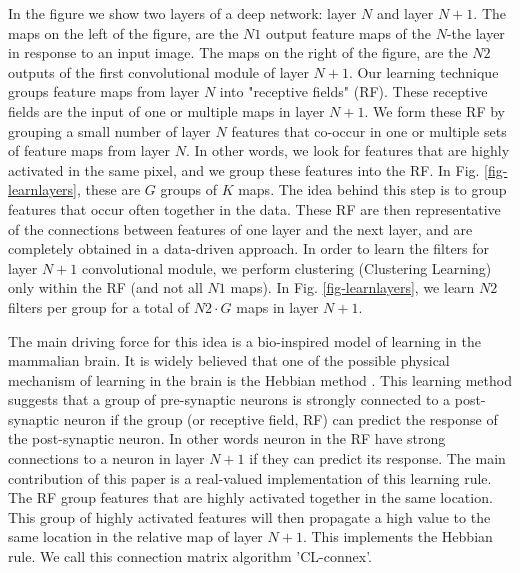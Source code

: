 \documentclass{article} %
\begin{document}
In the figure we show two layers of a deep network: layer $N$ and layer $N+1$. The maps on the left of the figure, are the $N1$ output feature maps of the $N$-the layer in response to an input image. The maps on the right of the figure, are the $N2$ outputs of the first convolutional module of layer $N+1$. 
Our learning technique groups feature maps from layer $N$ into "receptive fields" (RF). These receptive fields are the input of one or multiple maps in layer $N+1$. We form these RF by grouping a small number of layer $N$ features that co-occur in one or multiple sets of feature maps from layer $N$. In other words, we look for features that are highly activated in the same pixel, and we group these features into the RF. In Fig. \ref{fig-learnlayers}, these are $G$ groups of $K$ maps. The idea behind this step is to group features that occur often together in the data. These RF are then representative of the connections between features of one layer and the next layer, and are completely obtained in a data-driven approach.
In order to learn the filters for layer $N+1$ convolutional module, we perform clustering (Clustering Learning) only within the RF (and not all $N1$ maps). In Fig. \ref{fig-learnlayers}, we learn $N2$ filters per group for a total of $N2 \cdot G$ maps in layer $N+1$.

The main driving force for this idea is a bio-inspired model of learning in the mammalian brain. It is widely believed that one of the possible physical mechanism of learning in the brain is the Hebbian method \cite{masquelier2007learning}. This learning method suggests that a group of pre-synaptic neurons is strongly connected to a post-synaptic neuron if the group (or receptive field, RF) can predict the response of the post-synaptic neuron. In other words neuron in the RF have strong connections to a neuron in layer $N+1$ if they can predict its response. The main contribution of this paper is a real-valued implementation of this learning rule. The RF group features that are highly activated together in the same location. This group of highly activated features will then propagate a high value to the same location in the relative map of layer $N+1$. This implements the Hebbian rule. We call this connection matrix algorithm 'CL-connex'.
\end{document}
